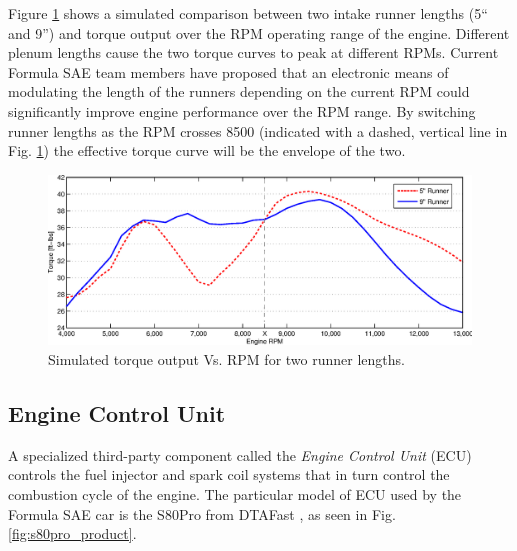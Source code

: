 Figure \ref{fig:irl_effect} shows a simulated comparison between two intake runner lengths (5`` and 9'') and torque output over the RPM operating range of the engine. Different plenum lengths cause the two torque curves to peak at different RPMs. Current Formula SAE team members have proposed that an electronic means of modulating the length of the runners depending on the current RPM could significantly improve engine performance over the RPM range. By switching runner lengths as the RPM crosses 8500 (indicated with a dashed, vertical line in Fig. \ref{fig:irl_effect}) the effective torque curve will be the envelope of the two.

\begin{figure}[H]
\centering
\includegraphics[width=6in,keepaspectratio]{background/figures/irl_effect2.eps}
\caption{Simulated torque output Vs. RPM for two runner lengths.}
\label{fig:irl_effect}
\end{figure}

\subsection{Engine Control Unit}
\label{sec:ECU}


A specialized third-party component called the \emph{Engine Control Unit} (ECU) controls the fuel injector and spark coil systems that in turn control the combustion cycle of the engine. The particular model of ECU used by the Formula SAE car is the S80Pro from DTAFast \cite{s80pro}, as seen in Fig. \ref{fig:s80pro_product}.

